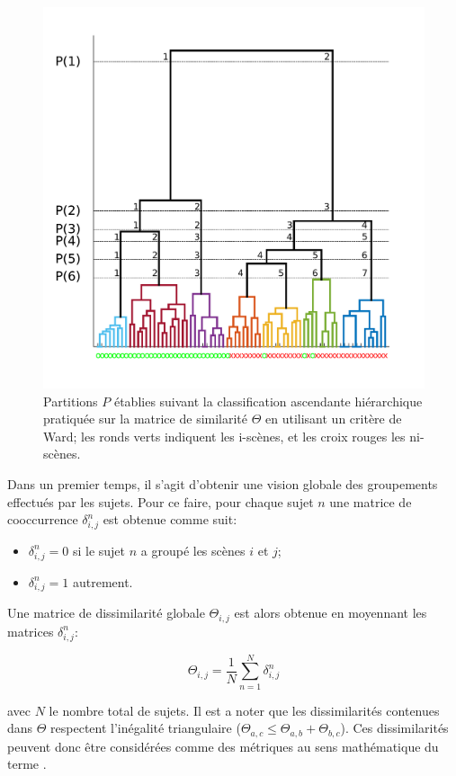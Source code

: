 \begin{figure}[t]
        \myfloatalign
        \includegraphics[width=.8\linewidth]{gfx/ch_5/dendrogram}
        \caption[Partitions $P$ établies suivant la classification ascendante hiérarchique.]{Partitions $P$ établies suivant la classification ascendante hiérarchique pratiquée sur la matrice de similarité $\Theta$ en utilisant un critère de Ward; les ronds verts indiquent les i-scènes, et les croix rouges les ni-scènes.}\label{fig:dendrogram}
\end{figure}

Dans un premier temps, il s'agit d'obtenir une vision globale des groupements effectués par les sujets. Pour ce faire, pour chaque sujet $n$ une matrice de cooccurrence $\delta^n_{i,j}$ est obtenue comme suit:

\begin{itemize}
\item $\delta^n_{i,j}=0$ si le sujet $n$ a groupé les scènes $i$ et $j$;
\item $\delta^n_{i,j}=1$ autrement.
\end{itemize}

Une matrice de dissimilarité globale $\Theta_{i,j}$ est alors obtenue en moyennant les matrices $\delta^n_{i,j}$:

\begin{equation}
\Theta_{i,j}= \dfrac{1}{N} \sum_{n=1}^{N}  \delta^n_{i,j}
\end{equation}

avec $N$ le nombre total de sujets. Il est a noter que les dissimilarités contenues dans $\Theta$ respectent l'inégalité triangulaire ($\Theta_{a,c}\leq\Theta_{a,b}+\Theta_{b,c}$). Ces dissimilarités peuvent donc être considérées comme des métriques au sens mathématique du terme \citep{parizet2012application}. 

